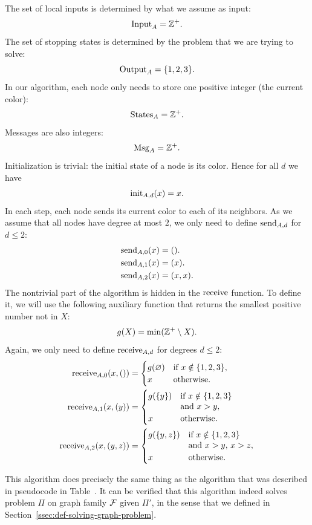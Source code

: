 The set of local inputs is determined by what we assume as input:
\[
    \operatorname{Input}_A = \mathbb{Z}^+.
\]
The set of stopping states is determined by the problem that we are trying to solve:
\[
    \operatorname{Output}_A = \{1,2,3\}.
\]
In our algorithm, each node only needs to store one positive integer (the current color):
\[
    \operatorname{States}_A = \mathbb{Z}^+.
\]
Messages are also integers:
\[
    \operatorname{Msg}_A = \mathbb{Z}^+.
\]
Initialization is trivial: the initial state of a node is its color. Hence for all $d$ we have
\[
    \operatorname{init}_{A,d}(x) = x.
\]
In each step, each node sends its current color to each of its neighbors. As we assume that all nodes have degree at most $2$, we only need to define $\operatorname{send}_{A,d}$ for $d \le 2$:
\begin{align*}
    \operatorname{send}_{A,0}(x) &= (). \\
    \operatorname{send}_{A,1}(x) &= (x). \\
    \operatorname{send}_{A,2}(x) &= (x,x).
\end{align*}
The nontrivial part of the algorithm is hidden in the $\operatorname{receive}$ function. To define it, we will use the following auxiliary function that returns the smallest positive number not in $X$:
\[
    g(X) = \min(\mathbb{Z}^+ \setminus X).
\]
Again, we only need to define $\operatorname{receive}_{A,d}$ for degrees $d \le 2$:
\begin{align*}
    \operatorname{receive}_{A,0}(x, ()) &= \begin{cases}
        g(\varnothing) & \text{if } x \notin \{1,2,3\}, \\
        x & \text{otherwise}.
    \end{cases}\\
    \operatorname{receive}_{A,1}(x, (y)) &= \begin{cases}
        g(\{y\}) & \text{if } x \notin \{1,2,3\}\\[-2pt]&\text{and } x > y, \\
        x & \text{otherwise}.
    \end{cases}\\
    \operatorname{receive}_{A,2}(x, (y, z)) &= \begin{cases}
        g(\{y,z\}) & \text{if } x \notin \{1,2,3\}\\[-2pt]&\text{and } x > y\text{, }x > z, \\
        x & \text{otherwise}.
    \end{cases}
\end{align*}

This algorithm does precisely the same thing as the algorithm that was described in pseudocode in Table~. It can be verified that this algorithm indeed solves problem $\Pi$ on graph family $\mathcal{F}$ given $\Pi'$, in the sense that we defined in Section~\ref{ssec:def-solving-graph-problem}.

